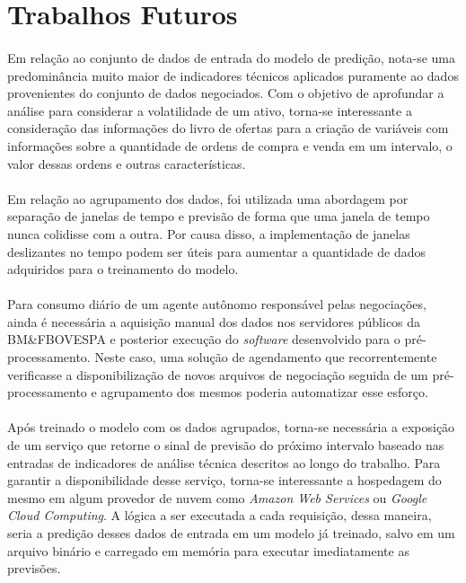 \documentclass[grad,numbers]{coppe}
\begin{document}
    \section{Trabalhos Futuros}
        
        \paragraph{}Em relação ao conjunto de dados de entrada do modelo de predição, nota-se uma predominância muito maior de indicadores técnicos aplicados puramente ao dados provenientes do conjunto de dados negociados. Com o objetivo de aprofundar a análise para considerar a volatilidade de um ativo, torna-se interessante a consideração das informações do livro de ofertas para a criação de variáveis com informações sobre a quantidade de ordens de compra e venda em um intervalo, o valor dessas ordens e outras características.
        
        \paragraph{}Em relação ao agrupamento dos dados, foi utilizada uma abordagem por separação de janelas de tempo e previsão de forma que uma janela de tempo nunca colidisse com a outra. Por causa disso, a implementação de janelas deslizantes no tempo podem ser úteis para aumentar a quantidade de dados adquiridos para o treinamento do modelo.
        
        \paragraph{}Para consumo diário de um agente autônomo responsável pelas negociações, ainda é necessária a aquisição manual dos dados nos servidores públicos da BM\&FBOVESPA e posterior execução do \textit{software} desenvolvido para o pré-processamento. Neste caso, uma solução de agendamento que recorrentemente verificasse a disponibilização de novos arquivos de negociação seguida de um pré-processamento e agrupamento dos mesmos poderia automatizar esse esforço.
        
        \paragraph{}Após treinado o modelo com os dados agrupados, torna-se necessária a exposição de um serviço que retorne o sinal de previsão do próximo intervalo baseado nas entradas de indicadores de análise técnica descritos ao longo do trabalho. Para garantir a disponibilidade desse serviço, torna-se interessante a hospedagem do mesmo em algum provedor de nuvem como \textit{Amazon Web Services} ou \textit{Google Cloud Computing}. A lógica a ser executada a cada requisição, dessa maneira, seria a predição desses dados de entrada em um modelo já treinado, salvo em um arquivo binário e carregado em memória para executar imediatamente as previsões.
  
\end{document}
